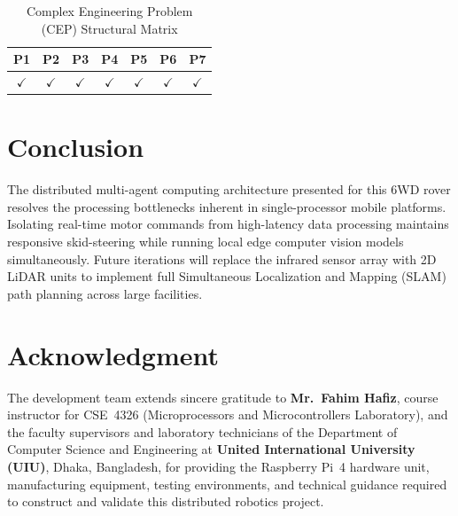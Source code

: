 \documentclass[conference]{IEEEtran}
\begin{document}
\begin{table}[htbp]
\caption{Complex Engineering Problem (CEP) Structural Matrix}
\begin{center}
\begin{tabular}{|c|c|c|c|c|c|c|}
\hline
\textbf{P1} & \textbf{P2} & \textbf{P3} & \textbf{P4} & \textbf{P5} & \textbf{P6} & \textbf{P7} \\
\hline
$\checkmark$ & $\checkmark$ & $\checkmark$ & $\checkmark$ & $\checkmark$ & $\checkmark$ & $\checkmark$ \\
\hline
\end{tabular}
\label{tab:cep_table}
\end{center}
\end{table}

\section{Conclusion}
The distributed multi-agent computing architecture presented for this 6WD rover resolves the processing bottlenecks inherent in single-processor mobile platforms. Isolating real-time motor commands from high-latency data processing maintains responsive skid-steering while running local edge computer vision models simultaneously. Future iterations will replace the infrared sensor array with 2D LiDAR units to implement full Simultaneous Localization and Mapping (SLAM) path planning across large facilities.

\section*{Acknowledgment}
The development team extends sincere gratitude to \textbf{Mr.~Fahim Hafiz}, course instructor for CSE~4326 (Microprocessors and Microcontrollers Laboratory), and the faculty supervisors and laboratory technicians of the Department of Computer Science and Engineering at \textbf{United International University (UIU)}, Dhaka, Bangladesh, for providing the Raspberry Pi~4 hardware unit, manufacturing equipment, testing environments, and technical guidance required to construct and validate this distributed robotics project.
\end{document}
